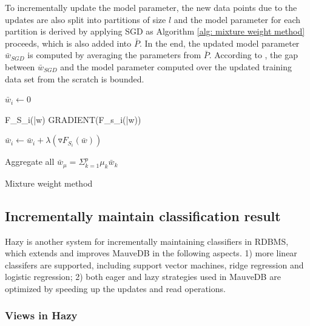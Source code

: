 To incrementally update the model parameter, the new data points due to the updates are also split into partitions of size $l$ and the model parameter for each partition is derived by applying SGD as Algorithm \ref{alg: mixture weight method} proceeds, which is also added into $\bar{P}$. In the end, the updated model parameter $\bar{w}_{SGD}$ is computed by averaging the parameters from $\bar{P}$. According to \cite{mcdonald2009efficient}, the gap between $\bar{w}_{SGD}$ and the model parameter computed over the updated training data set from the scratch is bounded.


\begin{algorithm}[h!] 
\footnotesize

 
 {
    $\bar{w}_i \leftarrow 0$
    
    {
        \Delta F_{S_i}(\bar{w}) \leftarrow GRADIENT(F_{s_i}(\bar{w}))
    
        $\bar{w}_i \leftarrow \bar{w}_i + \lambda(\triangledown F_{S_i}(\bar{w}))$
    }
    
    Aggregate all $\bar{w}_{\mu} = \Sigma_{k=1}^p\mu_k\bar{w}_k$    
 }
 
 \caption{Mixture weight method}
 \label{alg: mixture weight method}
 \end{algorithm}




\subsection{Incrementally maintain classification result}
Hazy is another system for incrementally maintaining classifiers in RDBMS, which extends and improves MauveDB in the following aspects. 1) more linear classifers are supported, including support vector machines, ridge regression and logistic regression; 2) both eager and lazy strategies used in MauveDB are optimized by speeding up the updates and read operations.

\subsubsection{Views in Hazy}



